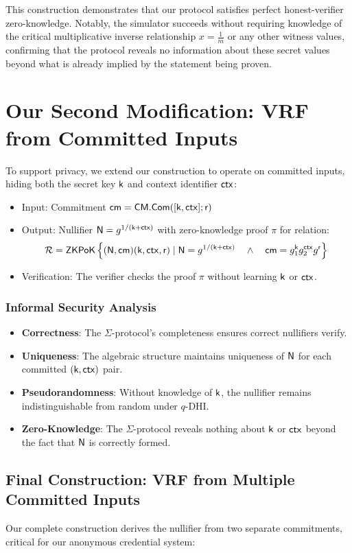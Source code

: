 This construction demonstrates that our protocol satisfies perfect honest-verifier zero-knowledge. Notably, the simulator succeeds without requiring knowledge of the critical multiplicative inverse relationship $x = \frac{1}{m}$ or any other witness values, confirming that the protocol reveals no information about these secret values beyond what is already implied by the statement being proven.




\section{Our Second Modification: VRF from Committed Inputs}
To support privacy, we extend our construction to operate on committed inputs, hiding both the secret key $\mathsf{k}$ and context identifier $\mathsf{ctx}$:

\begin{itemize}
    \item Input: Commitment $\mathsf{cm} = \mathsf{CM.Com}([\mathsf{k}, \mathsf{ctx}]; \mathsf{r})$
    \item Output: Nullifier $\mathsf{N} = g^{1/(\mathsf{k} + \mathsf{ctx})}$ with zero-knowledge proof $\pi$ for relation:
    \[
    \mathcal{R} = {\mathsf{ZKPoK}} \left\{ (\mathsf{N}, \mathsf{cm})(\mathsf{k}, \mathsf{ctx}, \mathsf{r}) \mid \mathsf{N} = g^{1/(\mathsf{k} + \mathsf{ctx})} \quad \wedge \quad \mathsf{cm} = g_1^{\mathsf{k}} g_2^{\mathsf{ctx}}g^{\mathsf{r}}  \right\}
    \]
    \item Verification: The verifier checks the proof $\pi$ without learning $\mathsf{k}$ or $\mathsf{ctx}$.
\end{itemize}

\subsubsection{Informal Security Analysis}
\begin{itemize}
    \item \textbf{Correctness}: The $\Sigma$-protocol's completeness ensures correct nullifiers verify.
    \item \textbf{Uniqueness}: The algebraic structure maintains uniqueness of $\mathsf{N}$ for each committed $(\mathsf{k},\mathsf{ctx})$ pair.
    \item \textbf{Pseudorandomness}: Without knowledge of $\mathsf{k}$, the nullifier remains indistinguishable from random under $q$-DHI.
    \item \textbf{Zero-Knowledge}: The $\Sigma$-protocol reveals nothing about $\mathsf{k}$ or $\mathsf{ctx}$ beyond the fact that $\mathsf{N}$ is correctly formed.
\end{itemize}

\subsection{Final Construction: VRF from Multiple Committed Inputs}
Our complete construction derives the nullifier from two separate commitments, critical for our anonymous credential system:

